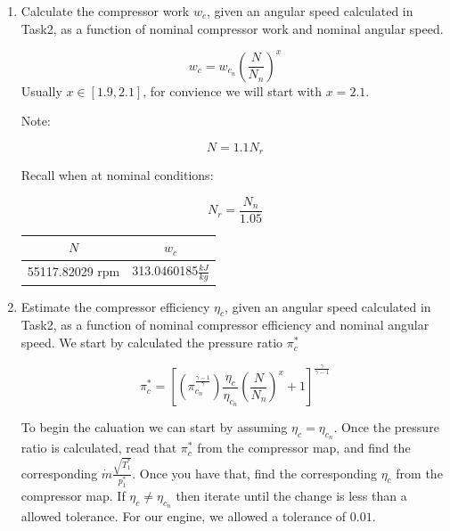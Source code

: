\documentclass[titlepage]{article}
\begin{document}
\begin{enumerate}
  \item Calculate the compressor work $w_{c}$, given an angular speed calculated
  in Task2, as a function of nominal compressor work and nominal angular speed.

  \begin{equation}
    w_{c} = w_{c_{n}} \left( \frac{N}{N_{n}} \right)^{x}
  \end{equation}
  Usually $x \in [1.9, 2.1]$, for convience we will start with $x = 2.1$.

  Note: 

  \begin{equation}
    N = 1.1N_{r}
  \end{equation}

  Recall when at nominal conditions:

  \begin{equation}
    N_{r} = \frac{N_{n}}{1.05}
  \end{equation}

  \begin{center}
    \begin{tabular}{|c|c|}
      \hline
      $N$ & $w_{c}$ \\
      \hline
      55117.82029 rpm & 313.0460185$\frac{kJ}{kg}$ \\
      \hline
    \end{tabular}
  \end{center}

  \item Estimate the compressor efficiency $\eta_{c}$, given an angular 
  speed calculated in Task2, as a function of nominal compressor efficiency and
  nominal angular speed. We start by calculated the pressure ratio $\pi_{c}^{*}$

  \begin{equation}
    \pi_{c}^{*} = \left[ \left(\pi_{c_{n}}^{\frac{\gamma-1}{\gamma}}\right)
    \frac{\eta_{c}}{\eta_{c_{n}}} \left(\frac{N}{N_{n}}\right)^{x} +1 \right]^{\frac{\gamma}{\gamma-1}}
  \end{equation}

  To begin the caluation we can start by assuming $\eta_{c} = \eta_{c_{n}}$. Once
  the pressure ratio is calculated, read that $\pi_{c}^{*}$ from the compressor map, 
  and find the corresponding $\dot{m}\frac{\sqrt{T_{1}^{*}}}{p_{1}^{*}}$. Once you have 
  that, find the corresponding $\eta_{c}$ from the compressor map. If $\eta_{c} \neq \eta_{c_{n}}$ 
  then iterate until the change is less than a allowed tolerance. For our engine,
  we allowed a tolerance of $0.01$.


\end{enumerate}
\end{document}

